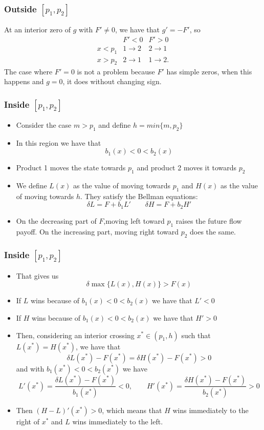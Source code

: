 \documentclass[10pt]{beamer}
\begin{document}
\begin{frame}
    \frametitle{Outside $[p_1,p_2]$}
    At an interior zero of $g$ with $F'\ne0$, we have that $g' = -F'$, so  
    \begin{equation*}
        \begin{array}{c|cc}
        &F'<0&F'>0\\ \hline
        x<p_1&1\to2&2\to1\\
        x>p_2&2\to1&1\to2.
        \end{array}
        \tag{*}
    \end{equation*} 
    The case where $F'=0$ is not a problem because $F'$ has simple zeros, when this happens and $g=0$, it does without changing sign.
\end{frame}


\begin{frame}
    \frametitle{Inside $[p_1,p_2]$}
    \begin{itemize}[<+->]
    \item Consider the case $m>p_1$ and define $h= min\{m,p_2\}$
    \item In this region we have that 
    $$b_1(x)<0<b_2(x)$$
    \item Product 1 moves the state towards $p_1$ and product 2 moves it towards $p_2$
    \item We define $L(x)$ as the value of moving towards $p_1$ and $H(x)$ as the value of moving towards $h$. They satisfy the Bellman equations: $$\delta L = F + b_1L' \qquad \delta H = F + b_2H'$$
    \item On the decreasing part of $F$,moving left toward $p_1$ raises the future flow payoff. On the increasing part, moving right toward $p_2$ does the same.
    \end{itemize}
\end{frame}

\begin{frame}
    \frametitle{Inside $[p_1,p_2]$}
    \begin{itemize}[<+->]
        \item That gives us $$\delta \max\{L(x),H(x)\}>F(x)$$
        \item If $L$ wins because of $b_1(x)<0<b_2(x)  $ we have that $L'<0$
        \item If $H$ wins because of $b_1(x)<0<b_2(x)  $ we have that $H'>0$
        \item Then, considering an interior crossing $x^*\in(p_1,h)$ such that $L(x^*)=H(x^*)$, we have that $$\delta L(x^*)-F(x^*) = \delta H(x^*)-F(x^*) >0 $$ and with $b_1(x^*)<0<b_2(x^*)$ we have $$L'(x^*) = \frac{\delta L (x^*) - F(x^*)}{b_1(x^*)}<0 ,\qquad H'(x^*) = \frac{\delta H (x^*) - F(x^*)}{b_2(x^*)}>0$$
        \item Then $(H-L)'(x^*)>0$, which means that $H$ wins immediately to the right of $x^*$ and $L$ wins immediately to the left.
    \end{itemize}
    
\end{frame}
\end{document}
